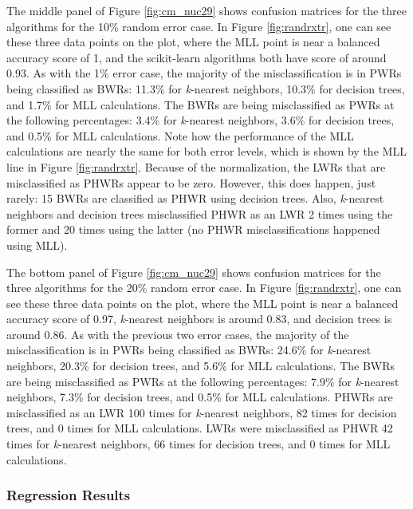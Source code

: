 The middle panel of Figure \ref{fig:cm_nuc29} shows confusion matrices for the
three algorithms for the 10\% random error case. In Figure \ref{fig:randrxtr},
one can see these three data points on the plot, where the \gls{MLL} point is
near a balanced accuracy score of 1, and the scikit-learn algorithms both have
score of around 0.93. As with the 1\% error case, the majority of the
misclassification is in \glspl{PWR} being classified as \glspl{BWR}: 11.3\% for
\textit{k}-nearest neighbors, 10.3\% for decision trees, and 1.7\% for
\gls{MLL} calculations.  The \glspl{BWR} are being misclassified as \glspl{PWR}
at the following percentages: 3.4\% for \textit{k}-nearest neighbors, 3.6\% for
decision trees, and 0.5\% for \gls{MLL} calculations. Note how the performance
of the \gls{MLL} calculations are nearly the same for both error levels, which
is shown by the \gls{MLL} line in Figure \ref{fig:randrxtr}. Because of the
normalization, the \gls{LWR}s that are misclassified as \glspl{PHWR} appear to
be zero. However, this does happen, just rarely: 15 \glspl{BWR} are classified
as \gls{PHWR} using decision trees. Also, \textit{k}-nearest neighbors and
decision trees misclassified \gls{PHWR} as an \gls{LWR} 2 times using the
former and 20 times using the latter (no \gls{PHWR} misclassifications happened
using \gls{MLL}).

The bottom panel of Figure \ref{fig:cm_nuc29} shows confusion matrices for the
three algorithms for the 20\% random error case. In Figure \ref{fig:randrxtr},
one can see these three data points on the plot, where the \gls{MLL} point is
near a balanced accuracy score of 0.97, \textit{k}-nearest neighbors is around
0.83, and decision trees is around 0.86. As with the previous two error cases,
the majority of the misclassification is in \glspl{PWR} being classified as
\glspl{BWR}: 24.6\% for \textit{k}-nearest neighbors, 20.3\% for decision trees,
and 5.6\% for \gls{MLL} calculations.  The \glspl{BWR} are being misclassified
as \glspl{PWR} at the following percentages: 7.9\% for \textit{k}-nearest
neighbors, 7.3\% for decision trees, and 0.5\% for \gls{MLL} calculations.
\Gls{PHWR}s are misclassified as an \gls{LWR} 100 times for \textit{k}-nearest
neighbors, 82 times for decision trees, and 0 times for \gls{MLL} calculations.
\Gls{LWR}s were misclassified as \gls{PHWR} 42 times for \textit{k}-nearest
neighbors, 66 times for decision trees, and 0 times for \gls{MLL} calculations.

\subsubsection{Regression Results}
\label{sec:randerrB}

